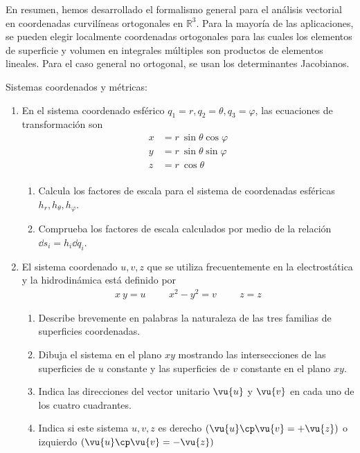 En resumen, hemos desarrollado el formalismo general para el análisis vectorial en coordenadas curvilíneas ortogonales en $\mathbb{R}^{3}$. Para la mayoría de las aplicaciones, se pueden elegir localmente coordenadas ortogonales para las cuales los elementos de superficie y volumen en integrales múltiples son productos de elementos lineales. Para el caso general no ortogonal, se usan los determinantes Jacobianos.
\begin{ejer}{Sistemas coordenados y métricas:}
\begin{enumerate}
\item En el sistema coordenado esférico $q_{1} = r, q_{2} = \theta, q_{3} = \varphi$, las ecuaciones de transformación son
\begin{align*}
x &= r \: \sin \theta \cos \varphi \\
y &= r \: \sin \theta \sin \varphi \\
z &= r \: \cos \theta \\
\end{align*}
\begin{enumerate}[label=(\alph*)]
\item Calcula los factores de escala para el sistema de coordenadas esféricas $h_{r}, h_{\theta}, h_{\varphi}$.
\item Comprueba los factores de escala calculados por medio de la relación $\dd{s}_{i} = h_{i} \dd{q}_{i}$.
\end{enumerate}
\item El sistema coordenado $u, v, z$ que se utiliza frecuentemente en la electrostática y la hidrodinámica está definido por
\begin{align*}
x \: y = u \hspace{1cm} x^{2} - y^{2} = v \hspace{1cm} z = z
\end{align*}
\begin{enumerate}[label=(\alph*)]
\item Describe brevemente en palabras la naturaleza de las tres familias de superficies coordenadas.
\item Dibuja el sistema en el plano $xy$ mostrando las intersecciones de las superficies de $u$ constante y las superficies de $v$ constante en el plano $xy$.
\item Indica las direcciones del vector unitario $\vu{u}$ y $\vu{v}$ en cada uno de los cuatro cuadrantes.
\item Indica si este sistema $u, v, z$ es derecho $(\vu{u} \cp \vu{v} = + \vu{z} )$ o izquierdo $(\vu{u} \cp \vu{v} = - \vu{z} )$

\end{enumerate}
\end{enumerate}
\end{ejer}
